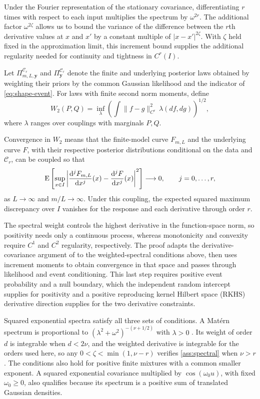 Under the Fourier representation of the stationary covariance,
differentiating $r$ times with respect to each input multiplies
the spectrum by $\omega^{2r}$. The additional factor $\omega^{2\zeta}$
allows us to bound the variance of the difference between the $r$th
derivative values at $x$ and $x'$ by a constant multiple of
$|x-x'|^{2\zeta}$. With $\zeta$ held fixed in the approximation limit,
this increment bound supplies the additional regularity needed for
continuity and tightness in $C^r(I)$.

Let $\Pi_{m,L,\boldsymbol y}^{\mathcal C_r}$ and
$\Pi_{\boldsymbol y}^{\mathcal C_r}$ denote the finite and underlying
posterior laws obtained by weighting their priors by the common
Gaussian likelihood and the indicator of \cref{eq:shape-event}.
For laws with finite second norm moments, define
\[
 W_2(P,Q)=\inf_{\lambda}
 \left(\int\|f-g\|_{C^r}^2\,\lambda(df,dg)\right)^{1/2},
\]
where $\lambda$ ranges over couplings with marginals $P,Q$.

Convergence in $W_2$ means that the finite-model curve $F_{m,L}$ and
the underlying curve $F$, with their respective posterior distributions
conditional on the data and $\mathcal C_r$, can be coupled so that
\[
 \operatorname{E}\left[
 \sup_{x\in I}
 \left|
 \frac{\mathrm{d}^jF_{m,L}}{\mathrm{d}x^j}(x)
 -
 \frac{\mathrm{d}^jF}{\mathrm{d}x^j}(x)
 \right|^2
 \right]\longrightarrow0,
 \qquad j=0,\ldots,r,
\]
as $L\to\infty$ and $m/L\to\infty$. Under this coupling, the
expected squared maximum discrepancy over $I$ vanishes for the
response and each derivative through order $r$.



The spectral weight controls the highest derivative in the
function-space norm, so positivity needs only a continuous process,
whereas monotonicity and convexity require $C^1$ and $C^2$ regularity,
respectively. The proof adapts the derivative-covariance argument of
\citet[Theorem 2 and its proof]{differentialensembles2026} to the
weighted-spectral conditions above, then uses increment moments to
obtain convergence in that space and passes through likelihood
and event conditioning. This last step requires positive event
probability and a null boundary, which the independent random intercept
supplies for positivity and a positive reproducing kernel Hilbert space
(RKHS) derivative direction supplies for the two derivative constraints.

Squared exponential spectra satisfy all three sets of conditions. A Mat\'ern
spectrum is proportional to
$(\lambda^2+\omega^2)^{-(\nu+1/2)}$ with $\lambda>0$
\citep[Chapter 4]{rasmussen2006gpml}. Its weight of order $d$ is
integrable when $d<2\nu$, and the weighted derivative is integrable
for the orders used here, so any
$0<\zeta<\min(1,\nu-r)$ verifies \cref{ass:spectral} when
$\nu>r$. The conditions also hold for positive finite mixtures with
a common smaller exponent. A squared exponential covariance multiplied
by $\cos(\omega_0u)$, with fixed $\omega_0\geq0$, also qualifies
because its spectrum is a positive sum of translated Gaussian densities.
